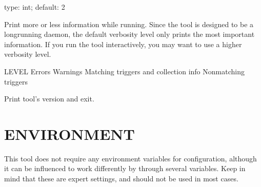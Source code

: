 \documentclass[letterpaper,10pt,english]{sphinxmanual}
\begin{document}
\begin{fulllineitems}
\label{\detokenize{mariadb-stat:cmdoption-mariadb-stat-verbose}}
type: int; default: 2

Print more or less information while running.  Since the tool is designed
to be a long\sphinxhyphen{}running daemon, the default verbosity level only prints the
most important information.  If you run the tool interactively, you may
want to use a higher verbosity level.

\begin{sphinxVerbatim}[commandchars=\\\{\}]
LEVEL 
 
     Errors
     Warnings
     Matching triggers and collection info
     Non\PYGZhy{}matching triggers
\end{sphinxVerbatim}

\end{fulllineitems}


\begin{fulllineitems}
\label{\detokenize{mariadb-stat:cmdoption-mariadb-stat-version}}
Print tool’s version and exit.

\end{fulllineitems}



\section{ENVIRONMENT}
\label{\detokenize{mariadb-stat:environment}}
This tool does not require any environment variables for configuration,
although it can be influenced to work differently by through several
variables.  Keep in mind that these are expert settings, and should not
be used in most cases.
\end{document}
